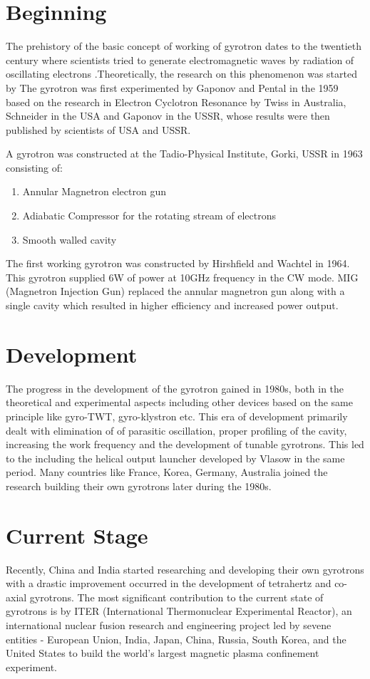 \section{Beginning}\label{sec:beginning}
The prehistory of the basic concept of working of gyrotron dates to the twentieth century where scientists tried to generate electromagnetic waves by radiation of oscillating electrons .Theoretically, the research on this phenomenon was started by 
The gyrotron was first experimented by Gaponov and Pental in the 1959 based on the research in Electron Cyclotron Resonance by Twiss in Australia, Schneider in the USA and Gaponov in the USSR, whose results were then published by scientists of USA and USSR.\cite{ref:tg}\cite{ref:gt}
 
A gyrotron was constructed at the Tadio-Physical Institute, Gorki, USSR in 1963 consisting of:

\begin{enumerate}
\item Annular Magnetron electron gun
\item Adiabatic Compressor for the rotating stream of electrons
\item Smooth walled cavity
\end{enumerate}

The first working gyrotron was constructed by Hirshfield and Wachtel in 1964. This gyrotron supplied 6W of power at 10GHz frequency in the CW mode. MIG (Magnetron Injection Gun) replaced the annular magnetron gun along with a single cavity which resulted in higher efficiency and increased power output.

\section{Development}
The progress in the development of the gyrotron gained in 1980s, both in the theoretical and experimental aspects including other devices based on the same principle like gyro-TWT, gyro-klystron  etc. This era of development primarily dealt with elimination of of parasitic oscillation, proper profiling of the cavity, increasing the work frequency and the development of tunable gyrotrons. This led to the including the helical output launcher developed by Vlasow in the same period. Many countries like France, Korea, Germany, Australia joined the research building their own gyrotrons later during the 1980s.

\section{Current Stage}
 Recently, China and India started researching and developing their own gyrotrons with a drastic improvement occurred in the development of tetrahertz and co-axial gyrotrons. The most significant contribution to the current state of gyrotrons is by ITER (International Thermonuclear Experimental Reactor), an international nuclear fusion research and engineering project led by sevene entities - European Union, India, Japan, China, Russia, South Korea, and the United States to build the world's largest magnetic plasma confinement experiment.

